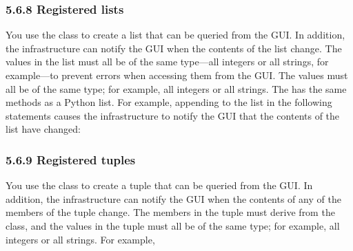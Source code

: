 \documentclass[letterpaper,10pt,english]{sphinxmanual}
\begin{document}
\begin{sphinxVerbatim}[commandchars=\\\{\},numbers=left,firstnumber=1,stepnumber=1]
   
  
\PYG{p}{[}\PYG{p}{]}  
 
\end{sphinxVerbatim}


\subsubsection{5.6.8 Registered lists}
\label{\detokenize{abq_script_guide:registered-lists}}
You use the  class to create a list that can be queried from the GUI. In addition, the infrastructure can notify the GUI when the contents of the list change. The values in the list must all be of the same type—all integers or all strings, for example—to prevent errors when accessing them from the GUI. The values must all be of the same type; for example, all integers or all strings. The  has the same methods as a Python list. For example, appending  to the list in the following statements causes the infrastructure to notify the GUI that the contents of the list have changed:

\begin{sphinxVerbatim}[commandchars=\\\{\},numbers=left,firstnumber=1,stepnumber=1]
   
  
\end{sphinxVerbatim}


\subsubsection{5.6.9 Registered tuples}
\label{\detokenize{abq_script_guide:registered-tuples}}
You use the  class to create a tuple that can be queried from the GUI. In addition, the infrastructure can notify the GUI when the contents of any of the members of the tuple change. The members in the tuple must derive from the  class, and the values in the tuple must all be of the same type; for example, all integers or all strings. For example,
\end{document}
